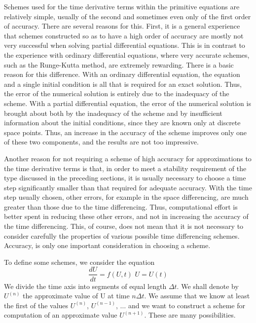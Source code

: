 Schemes used for the time derivative terms within the primitive equations are relatively simple, usually of the second and sometimes even only of the first order of accuracy. There are several reasons for this. First, it is a general experience that schemes constructed so as to have a high order of accuracy are mostly not very successful when solving partial differential equations. This is in contrast to the experience with ordinary differential equations, where very accurate schemes, such as the Runge-Kutta method, are extremely rewarding. There is a basic reason for this difference. With an ordinary differential equation, the equation and a single initial condition is all that is required for an exact solution. Thus, the error of the numerical solution is entirely due to the inadequacy of the scheme. With a partial differential equation, the error of the numerical solution is brought about both by the inadequacy of the scheme and by insufficient information about the initial conditions, since they are known only at discrete space points. Thus, an increase in the accuracy of the scheme improves only one of these two components, and the results are not too impressive.

Another reason for not requiring a scheme of high accuracy for approximations to the time derivative terms is that, in order to meet a stability requirement of the type discussed in the preceding sections, it is usually necessary to choose a time step significantly smaller than that required for adequate accuracy. With the time step usually chosen, other errors, for example in the space differencing, are much greater than those due to the time differencing. Thus, computational effort is better spent in reducing these other errors, and not in increasing the accuracy of the time differencing. This, of course, does not mean that it is not necessary to consider carefully the properties of various possible time differencing schemes. Accuracy, is only one important consideration in choosing a scheme.

To define some schemes, we consider the equation
\begin{equation}\label{eq.3.1.3}
	\frac{dU}{dt}= f(U,t) \,\, U=U(t)
\end{equation}
We divide the time axis into segments of equal length $\Delta t$. We shall denote by
$U^{(n)}$ the approximate value of U at time $n\Delta t$. We assume that we know at least the first of the values $U^{(n)}$, $U^{(n-1)}$, $\dots$ and we want to construct a scheme for computation of an approximate value $U^{(n+1)}$. These are many possibilities.
